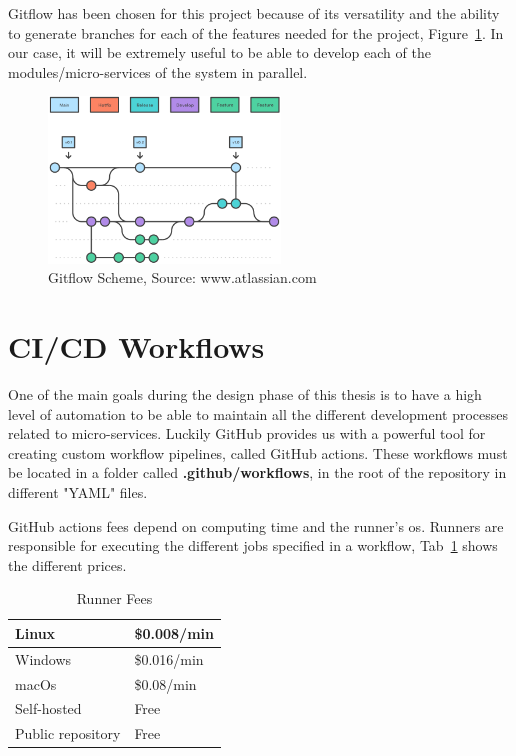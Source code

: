 Gitflow has been chosen for this project because of its versatility and the ability to generate branches for each of the features needed for the project, Figure~\ref{fig:gitflow-example}. In our case, it will be extremely useful to be able to develop each of the modules/micro-services of the system in parallel.

\begin{figure}[H]
    \centering
    \includegraphics[width=0.55\textwidth]{figures/gitflow.png}
    \caption{Gitflow Scheme, Source: www.atlassian.com}
    \label{fig:gitflow-example}
\end{figure}

\section{CI/CD Workflows}

One of the main goals during the design phase of this thesis is to have a high level of automation to be able to maintain all the different development processes related to micro-services. Luckily GitHub provides us with a powerful tool for creating custom workflow pipelines, called GitHub actions. These workflows must be located in a folder called \textbf{.github/workflows}, in the root of the repository in different "YAML" files.

GitHub actions fees depend on computing time and the runner's \gls{os}. Runners are responsible for executing the different jobs specified in a workflow, Tab~\ref{tab:action-fees} shows the different prices.

\begin{table}[h]
\centering
\caption{Runner Fees}
\label{tab:action-fees}
\begin{tabular}{@{}ll@{}}
\toprule
Linux             & \$0.008/min \\ \midrule
Windows           & \$0.016/min \\ \midrule
macOs             & \$0.08/min  \\ \midrule
Self-hosted       & Free        \\ \midrule
Public repository & Free       
\end{tabular}
\end{table}


